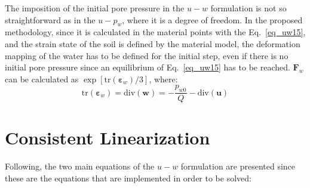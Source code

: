 \documentclass[preprint,12pt,a4paper]{elsarticle}
\begin{document}
The imposition of the initial pore pressure in the $u-w$ formulation is not so straightforward as in the $u-p_w$, where it is a degree of freedom. In the proposed methodology, since it is calculated in the material points with the Eq.~\eqref{eq_uw15}, and the strain state of the soil is defined by the material model, the deformation mapping of the water has to be defined for the initial step, even if there is no initial pore pressure since an equilibrium of Eq.~\eqref{eq_uw15} has to be reached. $\boldsymbol{F}_w$ can be calculated as $\exp{\left[\text{tr}\left(\boldsymbol{\varepsilon}_{w}\right)/3\right]}$, where:
\begin{equation}
  \text{tr}\left(\boldsymbol{\varepsilon}_{w}\right) = \mbox{div} (\boldsymbol{w}) = -\frac{p_{w0}}{Q} - \mbox{div} (\boldsymbol{u})
\end{equation}


\section{Consistent Linearization}
\label{ap:2}
Following, the two main equations of the $u-w$ formulation are presented since these are the equations that are implemented in order to be solved:
\end{document}
